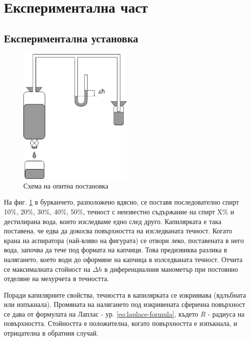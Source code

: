 \documentclass[12pt]{article}
\begin{document}
\section{Експериментална част}

\subsection{Експериментална установка}
\begin{figure}
    \centering
    \includegraphics[width=0.5\textwidth]{images/surface-tension-setup.png}
    \caption{\label{fig:setup}Схема на опитна постановка}
    \label{fig:setup}
\end{figure}

На фиг. \ref{fig:setup} в бурканчето, разположено вдясно, се поставя последователно спирт 10\%, 20\%, 30\%, 40\%, 50\%, течност с неизвестно съдържание на спирт X\% и дестилирана вода, които изследваме едно след друго. Капилярката е така поставена, че едва да докосва повърхността на изследваната течност. Когато крана на аспиратора (най-вляво на фигурата) се отвори леко, поставената в него вода, започва да тече под формата на капчици. Това предизвиква разлика в налягането, което води до оформяне на капчица в излседваната течност. Отчита се максималната стойност на $\Delta h$ в диференциалния манометър при постоянно отделяне на мехурчета в течността. 

Поради капилярните свойства, течността в капилярката се изкриявава (вдлъбната или изпъкнала). Промяната на налягането под изкривената сферична повърхност се дава от формулата на Лаплас - ур. \ref{eq:laplace-formula}, където $R$ - радиуса на повърхността. Стойността е положителна, когато повърхността е изпъкнала, и отрицателна в обратния случай.
\end{document}
